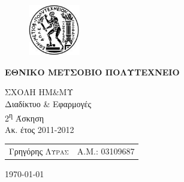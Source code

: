 \begin{titlepage}
\begin{center}
\begin{figure}[h] 
     \includegraphics[width=0.2\textwidth]{title/ntua_logo}
\end{figure}
\vspace{1cm}
\begin{LARGE}\textbf{ΕΘΝΙΚΟ ΜΕΤΣΟΒΙΟ ΠΟΛΥΤΕΧΝΕΙΟ\\[1.5cm]}\end{LARGE}
\begin{Large}
ΣΧΟΛΗ ΗΜ\&ΜΥ\\
Διαδίκτυο \& Εφαρμογές\\[2cm]
2\textsuperscript{η} Άσκηση\\
Ακ. έτος 2011-2012\\
\end{Large}
\vfill
\begin{flushright}
\begin{tabular}{l r}
{Γρηγόρης \textsc{Λύρας}}&
{Α.Μ.: 03109687}\\
\end{tabular}
\end{flushright}

\large\today\\
\end{center}
\end{titlepage}


